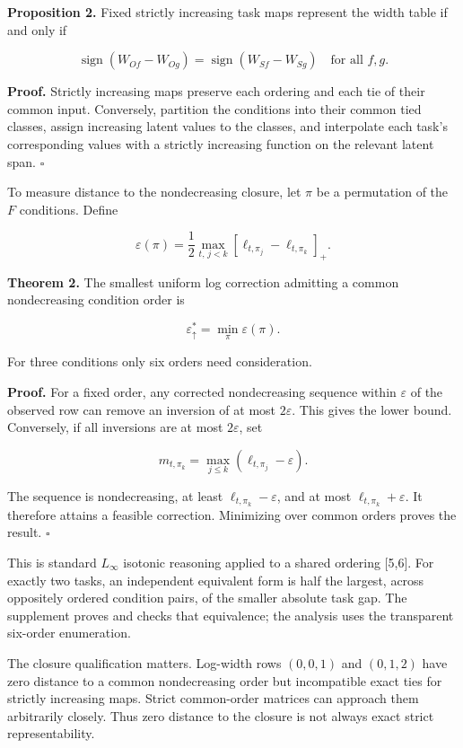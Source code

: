 \documentclass[
  11pt,
]{article}
\begin{document}
\textbf{Proposition 2.} Fixed strictly increasing task maps represent
the width table if and only if

\[
\operatorname{sign}(W_{Of}-W_{Og})
=\operatorname{sign}(W_{Sf}-W_{Sg})
\quad\text{for all }f,g.
\]

\textbf{Proof.} Strictly increasing maps preserve each ordering and each
tie of their common input. Conversely, partition the conditions into
their common tied classes, assign increasing latent values to the
classes, and interpolate each task's corresponding values with a
strictly increasing function on the relevant latent span. \(\square\)

To measure distance to the nondecreasing closure, let \(\pi\) be a
permutation of the \(F\) conditions. Define

\[
\varepsilon(\pi)
=\frac12\max_{t,\,j<k}
[\ell_{t,\pi_j}-\ell_{t,\pi_k}]_+.
\]

\textbf{Theorem 2.} The smallest uniform log correction admitting a
common nondecreasing condition order is

\[
\varepsilon_\uparrow^*=\min_\pi\varepsilon(\pi).
\]

For three conditions only six orders need consideration.

\textbf{Proof.} For a fixed order, any corrected nondecreasing sequence
within \(\varepsilon\) of the observed row can remove an inversion of at
most \(2\varepsilon\). This gives the lower bound. Conversely, if all
inversions are at most \(2\varepsilon\), set

\[
m_{t,\pi_k}=\max_{j\leq k}(\ell_{t,\pi_j}-\varepsilon).
\]

The sequence is nondecreasing, at least \(\ell_{t,\pi_k}-\varepsilon\),
and at most \(\ell_{t,\pi_k}+\varepsilon\). It therefore attains a
feasible correction. Minimizing over common orders proves the result.
\(\square\)

This is standard \(L_\infty\) isotonic reasoning applied to a shared
ordering {[}5,6{]}. For exactly two tasks, an independent equivalent
form is half the largest, across oppositely ordered condition pairs, of
the smaller absolute task gap. The supplement proves and checks that
equivalence; the analysis uses the transparent six-order enumeration.

The closure qualification matters. Log-width rows \((0,0,1)\) and
\((0,1,2)\) have zero distance to a common nondecreasing order but
incompatible exact ties for strictly increasing maps. Strict
common-order matrices can approach them arbitrarily closely. Thus zero
distance to the closure is not always exact strict representability.
\end{document}
